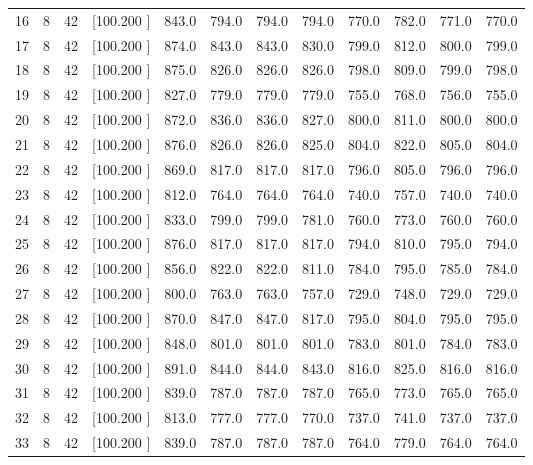 \documentclass[12pt,a4paper]{article}
\begin{document}
\begin{center}
{\begin{tabular}{r r r r r r r r r r r r}
  16&  8& 42&[100.200   ]&   843.0&   794.0&   794.0&   794.0&   770.0&   782.0&   771.0&   770.0\\[-0.02in]
  17&  8& 42&[100.200   ]&   874.0&   843.0&   843.0&   830.0&   799.0&   812.0&   800.0&   799.0\\[-0.02in]
  18&  8& 42&[100.200   ]&   875.0&   826.0&   826.0&   826.0&   798.0&   809.0&   799.0&   798.0\\[-0.02in]
  19&  8& 42&[100.200   ]&   827.0&   779.0&   779.0&   779.0&   755.0&   768.0&   756.0&   755.0\\[-0.02in]
  20&  8& 42&[100.200   ]&   872.0&   836.0&   836.0&   827.0&   800.0&   811.0&   800.0&   800.0\\[-0.02in]
  21&  8& 42&[100.200   ]&   876.0&   826.0&   826.0&   825.0&   804.0&   822.0&   805.0&   804.0\\[-0.02in]
  22&  8& 42&[100.200   ]&   869.0&   817.0&   817.0&   817.0&   796.0&   805.0&   796.0&   796.0\\[-0.02in]
  23&  8& 42&[100.200   ]&   812.0&   764.0&   764.0&   764.0&   740.0&   757.0&   740.0&   740.0\\[-0.02in]
  24&  8& 42&[100.200   ]&   833.0&   799.0&   799.0&   781.0&   760.0&   773.0&   760.0&   760.0\\[-0.02in]
  25&  8& 42&[100.200   ]&   876.0&   817.0&   817.0&   817.0&   794.0&   810.0&   795.0&   794.0\\[-0.02in]
  26&  8& 42&[100.200   ]&   856.0&   822.0&   822.0&   811.0&   784.0&   795.0&   785.0&   784.0\\[-0.02in]
  27&  8& 42&[100.200   ]&   800.0&   763.0&   763.0&   757.0&   729.0&   748.0&   729.0&   729.0\\[-0.02in]
  28&  8& 42&[100.200   ]&   870.0&   847.0&   847.0&   817.0&   795.0&   804.0&   795.0&   795.0\\[-0.02in]
  29&  8& 42&[100.200   ]&   848.0&   801.0&   801.0&   801.0&   783.0&   801.0&   784.0&   783.0\\[-0.02in]
  30&  8& 42&[100.200   ]&   891.0&   844.0&   844.0&   843.0&   816.0&   825.0&   816.0&   816.0\\[-0.02in]
  31&  8& 42&[100.200   ]&   839.0&   787.0&   787.0&   787.0&   765.0&   773.0&   765.0&   765.0\\[-0.02in]
  32&  8& 42&[100.200   ]&   813.0&   777.0&   777.0&   770.0&   737.0&   741.0&   737.0&   737.0\\[-0.02in]
  33&  8& 42&[100.200   ]&   839.0&   787.0&   787.0&   787.0&   764.0&   779.0&   764.0&   764.0\\[-0.02in]

\end{tabular}}
\end{center}
\end{document}
